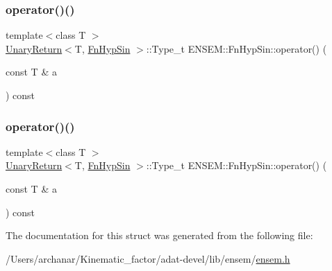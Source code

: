 \mbox{\label{structENSEM_1_1FnHypSin_a21db44c9d0efe64e1e59ceae24fc7d48}} 
\subsubsection{\texorpdfstring{operator()()}{operator()()}\hspace{0.1cm}{\footnotesize\ttfamily [2/3]}}
{\footnotesize\ttfamily template$<$class T $>$ \\
\mbox{\hyperlink{structENSEM_1_1UnaryReturn}{Unary\+Return}}$<$T, \mbox{\hyperlink{structENSEM_1_1FnHypSin}{Fn\+Hyp\+Sin}} $>$\+::Type\+\_\+t E\+N\+S\+E\+M\+::\+Fn\+Hyp\+Sin\+::operator() (\begin{DoxyParamCaption}\item[{const T \&}]{a }\end{DoxyParamCaption}) const\hspace{0.3cm}{\ttfamily [inline]}}

\mbox{\label{structENSEM_1_1FnHypSin_a21db44c9d0efe64e1e59ceae24fc7d48}} 
\subsubsection{\texorpdfstring{operator()()}{operator()()}\hspace{0.1cm}{\footnotesize\ttfamily [3/3]}}
{\footnotesize\ttfamily template$<$class T $>$ \\
\mbox{\hyperlink{structENSEM_1_1UnaryReturn}{Unary\+Return}}$<$T, \mbox{\hyperlink{structENSEM_1_1FnHypSin}{Fn\+Hyp\+Sin}} $>$\+::Type\+\_\+t E\+N\+S\+E\+M\+::\+Fn\+Hyp\+Sin\+::operator() (\begin{DoxyParamCaption}\item[{const T \&}]{a }\end{DoxyParamCaption}) const\hspace{0.3cm}{\ttfamily [inline]}}



The documentation for this struct was generated from the following file\+:\begin{DoxyCompactItemize}
\item 
/\+Users/archanar/\+Kinematic\+\_\+factor/adat-\/devel/lib/ensem/\mbox{\hyperlink{adat-devel_2lib_2ensem_2ensem_8h}{ensem.\+h}}\end{DoxyCompactItemize}
